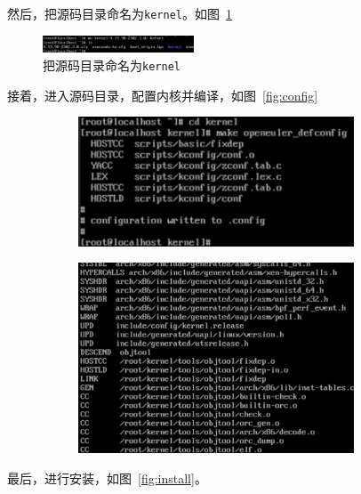 \documentclass[a4paper,twoside]{article}
\begin{document}
\begin{spacing}{1.2}
\begin{figure}[H]
\begin{subfigure}{0.45\textwidth}
	\end{subfigure}
\end{figure}
然后，把源码目录命名为\texttt{kernel}。如图~\ref{fig:rename}
\begin{figure}[H]
	\centering
	\caption{把源码目录命名为\texttt{kernel}}
	\label{fig:rename}
	\includegraphics[width=0.4\textwidth]{5.png}
\end{figure}
接着，进入源码目录，配置内核并编译，如图~\ref{fig:config}
\begin{figure}[H]
	\centering
	\caption{配置内核并编译}
	\label{fig:config}
	\begin{subfigure}{0.45\textwidth}
		\centering
		\includegraphics*[width=0.9\textwidth]{6.png}
	\end{subfigure}
	\begin{subfigure}{0.45\textwidth}
		\centering
		\includegraphics*[width=0.9\textwidth]{7.png}
	\end{subfigure}
\end{figure}
最后，进行安装，如图~\ref{fig:install}。
\begin{figure}[H]
	\centering

\end{figure}
\end{spacing}
\end{document}
